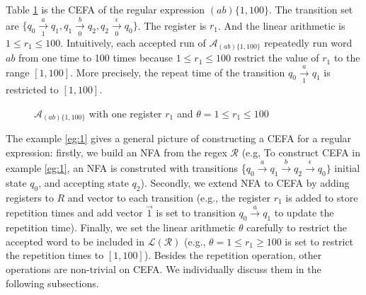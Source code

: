 \documentclass[runningheads]{llncs}
\newcommand*{\myvec}[1]{\vec{#1}}
\newcommand*{\regex}{\mathcal{R}}
\newcommand*{\lan}{\mathcal{L}}
\newcommand*{\aut}{\mathcal{A}}
\begin{document}
\begin{example}[The CEFA  $\aut_{(ab)\{1,100\}}$] \label{eg:1}
   Table \ref{fig:repetition} is the CEFA of the regular expression $(ab)\{1,100\}$. The transition set are $\{q_0\xrightarrow[1]{a} q_1, q_1 \xrightarrow[0]{b} q_2, q_2 \xrightarrow[0]{\epsilon} q_0\}$. The register is $r_1$. And the linear arithmetic is $1\leq r_1\leq 100$. Intuitively, each accepted run of $\aut_{(ab)\{1,100\}}$ repeatedly run word $ab$ from one time to 100 times because $1\leq r_1 \leq 100$ restrict the value of $r_1$ to the range $[1,100]$. More precisely, the repeat time of the transition $q_0\xrightarrow[1]{a}q_1$ is restricted to $[1,100]$.
  \begin{figure}[h]
    \centering
    \caption{$\aut_{(ab)\{1,100\}}$ with one register $r_1$ and $\theta = 1\leq r_1 \leq 100$}
    \label{fig:repetition}
  \end{figure}
\end{example}
The example \ref{eg:1} gives a general picture of constructing a CEFA for a regular expression: firstly, we build an NFA from the regex $\regex$
(e.g, To construct CEFA in example \ref{eg:1}, an NFA is construted with
transitions \{$q_0\xrightarrow{a} q_1\xrightarrow{b}q_2\xrightarrow{\epsilon}
  q_0\}$ initial state $q_0$, and accepting state $q_2$). Secondly, we extend NFA to CEFA by adding registers to $R$ and vector to each transition (e.g., the
register $r_1$ is added to store repetition times and add vector $\myvec{1}$ is set to transition $q_0\xrightarrow{a}q_1$ to update the repetition time). Finally, we set the
linear arithmetic $\theta$ carefully to restrict the accepted word to be
included in $\lan(\regex)$ (e.g., $\theta = 1\leq r_1\geq 100$ is set to
restrict the repetition times to $[1,100]$). Besides the repetition operation, other operations are non-trivial on CEFA. We individually discuss them in the following subsections.
\end{document}
